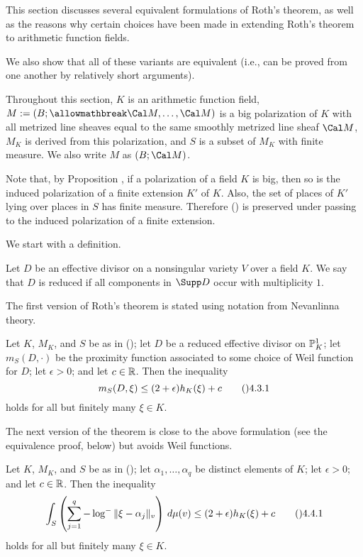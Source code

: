 This section discusses several equivalent formulations of Roth's theorem,
as well as the reasons why certain choices have been made in extending
Roth's theorem to arithmetic function fields.

We also show that all of these variants are equivalent (i.e., can be proved
from one another by relatively short arguments).

  Throughout this section, $K$ is an arithmetic
function field, $M:=(B;\allowmathbreak%
\Cal M,\dots,\Cal M)$ is a big polarization of $K$ with all
metrized line sheaves equal to the same smoothly metrized line sheaf $\Cal M$,
$M_K$ is derived from this polarization, and $S$ is a subset of $M_K$
with finite measure.  We also write $M$ as $(B;\Cal M)$.
\endit

Note that, by Proposition , if a polarization of a field $K$ is big,
then so is the induced polarization of a finite extension $K'$ of $K$.
Also, the set of places of $K'$ lying over places in $S$ has finite measure.
Therefore () is preserved under passing to the induced polarization
of a finite extension.

We start with a definition.

  Let $D$ be an effective divisor on a nonsingular variety $V$
over a field $K$.  We say that $D$ is {\bc reduced} if all components in
$\Supp D$ occur with multiplicity $1$.
\endit

The first version of Roth's theorem is stated using notation from
Nevanlinna theory.

  Let $K$, $M_K$, and $S$ be as in ();
let $D$ be a reduced effective divisor on $\Bbb P^1_K$;
let $m_S(D,\cdot)$ be the proximity function associated to some choice of
Weil function for $D$; let $\epsilon>0$; and let $c\in\Bbb R$.
Then the inequality
$$m_S(D,\xi) \le (2+\epsilon)h_K(\xi) + c\tag\04.3.1$$
holds for all but finitely many $\xi\in K$.
\endit

The next version of the theorem is close to the above formulation (see the
equivalence proof, below) but avoids Weil functions.

  Let $K$, $M_K$, and $S$ be as in ();
let $\alpha_1,\dots,\alpha_q$ be distinct elements of $K$;
let $\epsilon>0$; and let $c\in\Bbb R$.  Then the inequality
$$\int_S \left(\sum_{j=1}^q -\log^{-}\|\xi-\alpha_j\|_v\right)\,d\mu(v)
  \le (2+\epsilon)h_K(\xi) + c\tag\04.4.1$$
holds for all but finitely many $\xi\in K$.
\endit

